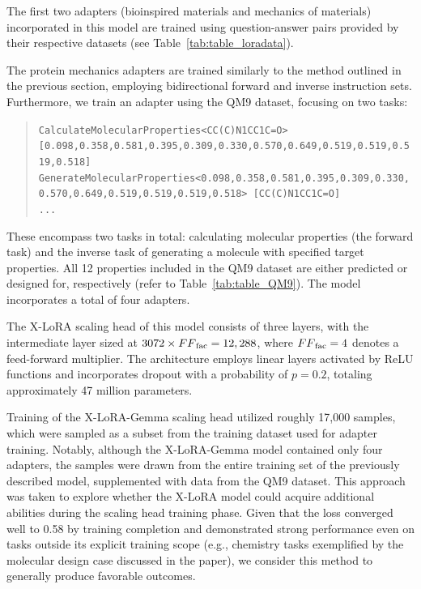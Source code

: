 The first two adapters (bioinspired materials and mechanics of materials) incorporated in this model are trained using question-answer pairs provided by their respective datasets (see Table~\ref{tab:table_loradata}).

The protein mechanics adapters are trained similarly to the method outlined in the previous section, employing bidirectional forward and inverse instruction sets. Furthermore, we train an adapter using the QM9 dataset, focusing on two tasks:

\begin{quote}
\tiny {\texttt{CalculateMolecularProperties<CC(C)N1CC1C=O> [0.098,0.358,0.581,0.395,0.309,0.330,0.570,0.649,0.519,0.519,0.519,0.518]\\
GenerateMolecularProperties<0.098,0.358,0.581,0.395,0.309,0.330,0.570,0.649,0.519,0.519,0.519,0.518> [CC(C)N1CC1C=O]\\ 
...
}}
\end{quote}

These encompass two tasks in total: calculating molecular properties (the forward task) and the inverse task of generating a molecule with specified target properties. All 12 properties included in the QM9 dataset are either predicted or designed for, respectively (refer to Table~\ref{tab:table_QM9}).  
The model incorporates a total of four adapters.  

The X-LoRA scaling head of this model consists of three layers, with the intermediate layer sized at $3072 \times {FF}_{\rm fac} = 12,288$, where ${FF}_{\rm fac} = 4$ denotes a feed-forward multiplier. The architecture employs linear layers activated by ReLU functions and incorporates dropout with a probability of $p=0.2$, totaling approximately 47 million parameters.  

Training of the X-LoRA-Gemma scaling head utilized roughly 17,000 samples, which were sampled as a subset from the training dataset used for adapter training. Notably, although the X-LoRA-Gemma model contained only four adapters, the samples were drawn from the entire training set of the previously described model, supplemented with data from the QM9 dataset. This approach was taken to explore whether the X-LoRA model could acquire additional abilities during the scaling head training phase. Given that the loss converged well to 0.58 by training completion and demonstrated strong performance even on tasks outside its explicit training scope (e.g., chemistry tasks exemplified by the molecular design case discussed in the paper), we consider this method to generally produce favorable outcomes.

